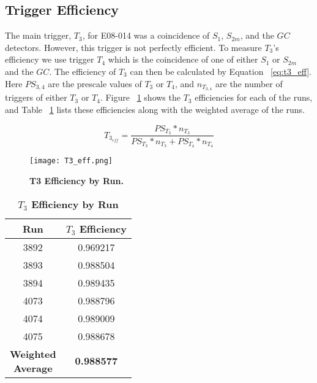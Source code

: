 \subsection{Trigger Efficiency}
\label{ssec:trigger_eff}

The main trigger, $T_3$, for E08-014 was a coincidence of $S_1$, $S_{2m}$, and the $GC$ detectors. However, this trigger is not perfectly efficient. To measure $T_3$'s efficiency we use trigger $T_4$ which is the coincidence of one of either $S_1$ or $S_{2m}$ and the $GC$. The efficiency of $T_3$ can then be calculated by Equation ~\ref{eq:t3_eff}. Here $PS_{3,4}$ are the prescale values of $T_3$ or $T_4$, and $n_{T_{3,4}}$ are the number of triggers of either $T_3$ or $T_4$. Figure ~\ref{fig:t3_eff} shows the $T_3$ efficiencies for each of the runs, and Table ~\ref{tab:t3_eff} lists these efficiencies along with the weighted average of the runs. 

\begin{equation} \label{eq:t3_eff}
	T_{3_{eff}} = \frac{PS_{T_3}*n_{T_3}}{PS_{T_3}*n_{T_3}+PS_{T_4}*n_{T_4}}
\end{equation}

\begin{figure}[!ht]
\begin{center}
\texttt{[image: T3\_eff.png]}
\end{center}
\caption{
{\bf{T3 Efficiency by Run.}} }
\label{fig:t3_eff}
\end{figure}

\begin{table}[!h]
\centering
\begin{tabular}{|c c|}
\hline
\textbf{Run} & \textbf{$T_3$ Efficiency}\\
\hline
3892 & 0.969217\\
3893 & 0.988504\\
3894 & 0.989435\\
4073 & 0.988796\\
4074 & 0.989009\\
4075 & 0.988678\\   
\hline
\makecell{\textbf{Weighted}\\ \textbf{Average}} & \textbf{0.988577} \\
\hline
\end{tabular}
\caption{{\bf{$T_3$ Efficiency by Run}} }
\label{tab:t3_eff}
\end{table}

